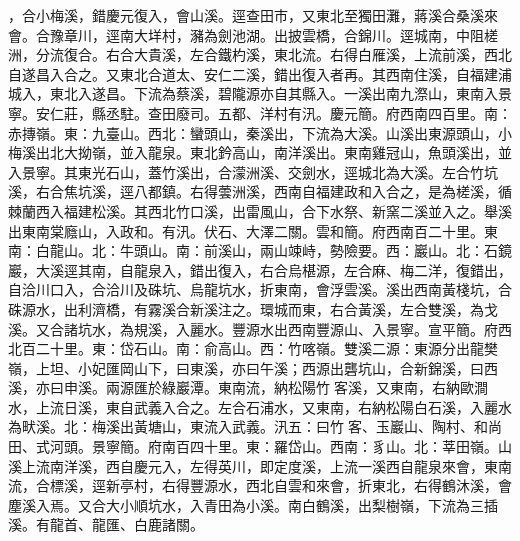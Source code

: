 \begin{pinyinscope}
，合小梅溪，錯慶元復入，會山溪。逕查田巿，又東北至獨田灘，蔣溪合桑溪來會。合豫章川，逕南大垟村，瀦為劍池湖。出披雲橋，合錦川。逕城南，中阻槎洲，分流復合。右合大貴溪，左合鐵杓溪，東北流。右得白雁溪，上流前溪，西北自遂昌入合之。又東北合道太、安仁二溪，錯出復入者再。其西南住溪，自福建浦城入，東北入遂昌。下流為蔡溪，碧隴源亦自其縣入。一溪出南九漈山，東南入景寧。安仁莊，縣丞駐。查田廢司。五都、洋村有汛。慶元簡。府西南四百里。南：赤摶嶺。東：九臺山。西北：蠻頭山，秦溪出，下流為大溪。山溪出東源頭山，小梅溪出北大拗嶺，並入龍泉。東北鈐高山，南洋溪出。東南雞冠山，魚頭溪出，並入景寧。其東光石山，蓋竹溪出，合濛洲溪、交劍水，逕城北為大溪。左合竹坑溪，右合焦坑溪，逕八都鎮。右得蕓洲溪，西南自福建政和入合之，是為槎溪，循棘蘭西入福建松溪。其西北竹口溪，出雷風山，合下水祭、新窯二溪並入之。舉溪出東南棠廕山，入政和。有汛。伏石、大澤二關。雲和簡。府西南百二十里。東南：白龍山。北：牛頭山。南：前溪山，兩山竦峙，勢險要。西：巖山。北：石鏡巖，大溪逕其南，自龍泉入，錯出復入，右合烏椹源，左合麻、梅二洋，復錯出，自洽川口入，合洽川及硃坑、烏龍坑水，折東南，會浮雲溪。溪出西南黃棧坑，合硃源水，出利濟橋，有霧溪合新溪注之。環城而東，右合黃溪，左合雙溪，為戈溪。又合諸坑水，為規溪，入麗水。豐源水出西南豐源山、入景寧。宣平簡。府西北百二十里。東：岱石山。南：俞高山。西：竹喀嶺。雙溪二源：東源分出龍樊嶺，上坦、小妃匯岡山下，曰東溪，亦曰午溪；西源出礱坑山，合新錦溪，曰西溪，亦曰申溪。兩源匯於綠巖潭。東南流，納松陽竹客溪，又東南，右納歐澗水，上流日溪，東自武義入合之。左合石浦水，又東南，右納松陽白石溪，入麗水為畎溪。北：梅溪出黃塘山，東流入武義。汛五：曰竹客、玉巖山、陶村、和尚田、式河頭。景寧簡。府南百四十里。東：羅岱山。西南：豸山。北：莘田嶺。山溪上流南洋溪，西自慶元入，左得英川，即定度溪，上流一溪西自龍泉來會，東南流，合標溪，逕新亭村，右得豐源水，西北自雲和來會，折東北，右得鶴沐溪，會塵溪入焉。又合大小順坑水，入青田為小溪。南白鶴溪，出梨樹嶺，下流為三插溪。有龍首、龍匯、白鹿諸關。


\end{pinyinscope}